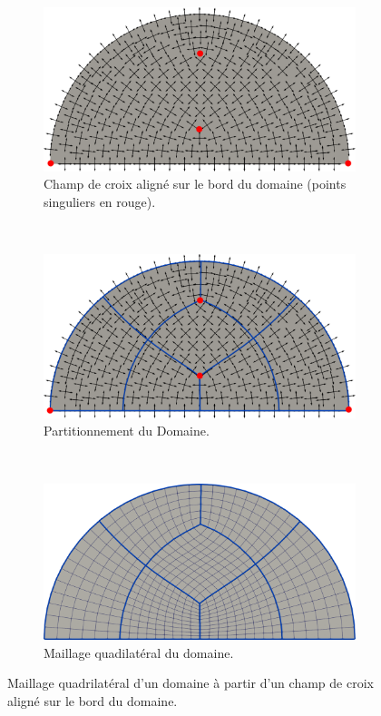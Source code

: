 \begin{figure}[!h]
\centering
\begin{subfigure}{0.64\textwidth}
    \includegraphics[width=\textwidth]{images/demi_disc_align_first.pdf}
    \caption{Champ de croix aligné sur le bord du domaine (points singuliers en rouge).}
    \label{fig:demi_disc_align_first}
\end{subfigure}
\\[3ex]
\begin{subfigure}{0.64\textwidth}
    \includegraphics[width=\textwidth]{images/demi_disc_align_second.pdf}
    \caption{Partitionnement du Domaine.}
    \label{fig:demi_disc_align_second}
\end{subfigure}
\\[3ex]
\begin{subfigure}{0.64\textwidth}
    \includegraphics[width=\textwidth]{images/demi_disc_align_third.pdf}
    \caption{Maillage quadilatéral du domaine.}
    \label{fig:demi_disc_align_third}
\end{subfigure}

\caption{Maillage quadrilatéral d'un domaine à partir d'un champ de croix aligné sur le bord du domaine.}
\label{fig:demi_disc_align}
\end{figure}

